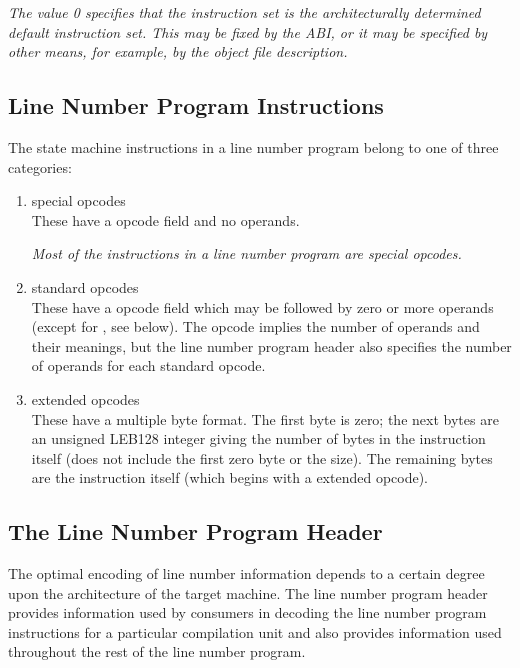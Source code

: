\textit{The 
 value 0 specifies that the instruction set is the
architecturally determined default instruction set. This may
be fixed by the ABI, or it may be specified by other means,
for example, by the object file description.}
\subsection{Line Number Program Instructions}
The state machine instructions in a line number program belong to one of three categories:

\begin{enumerate}[1. ]
\item special opcodes \\
These have a  opcode field and no operands.\vspace{1ex}

\textit{Most of the instructions in a 
line number program are special opcodes.}

\item standard opcodes \\
These have a  opcode field which may be followed by zero or more
 operands (except for 
\mbox{,} see below).
The opcode implies the number of operands and their meanings, but the
line number program header also specifies the number of operands for
each standard opcode.

\item extended opcodes \\
These have a multiple byte format. The first byte is zero; the next bytes
are an unsigned LEB128 integer giving the number of bytes in the
instruction itself (does not include the first zero byte or the size). The
remaining bytes are the instruction itself (which begins with a 
extended opcode). \\
\end{enumerate}


\subsection{The Line Number Program Header}

The optimal encoding of line number information depends to a
certain degree upon the architecture of the target machine. The
line number program header provides information used by
consumers in decoding the line number program instructions for
a particular compilation unit and also provides information
used throughout the rest of the line number program.

